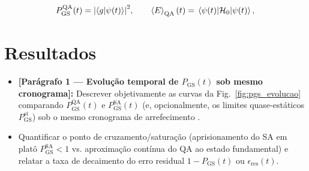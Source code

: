 \documentclass[aps,pre,twocolumn,10pt,superscriptaddress,nofootinbib]{revtex4-2}
\begin{document}
\begin{equation}
  P_{\text{GS}}^{\text{QA}}(t) = \abs{\braket{g}{\psi(t)}}^2, \qquad
  \ev{E}_{\text{QA}}(t) = \mel{\psi(t)}{\mathcal{H}_0}{\psi(t)},
  \label{eq:metricas}
\end{equation}

\section{Resultados}
\label{sec:resultados}

\begin{itemize}
  \item \textbf{[Parágrafo 1 --- Evolução temporal de $P_{\text{GS}}(t)$ sob mesmo cronograma]:}
        Descrever objetivamente as curvas da Fig.~\ref{fig:pgs_evolucao} comparando $P_{\text{GS}}^{\text{QA}}(t)$ e $P_{\text{GS}}^{\text{SA}}(t)$ (e, opcionalmente, os limites quase-estáticos $P_{\text{GS}}^{\text{st}}$) sob o mesmo cronograma de arrefecimento \cite{Kadowaki1998}.
  \item Quantificar o ponto de cruzamento/saturação (aprisionamento do SA em platô $P_{\text{GS}}^{\text{SA}} < 1$ vs. aproximação contínua do QA ao estado fundamental) e relatar a taxa de decaimento do erro residual $1 - P_{\text{GS}}(t)$ ou $\epsilon_{\text{res}}(t)$.
\end{itemize}
\end{document}
